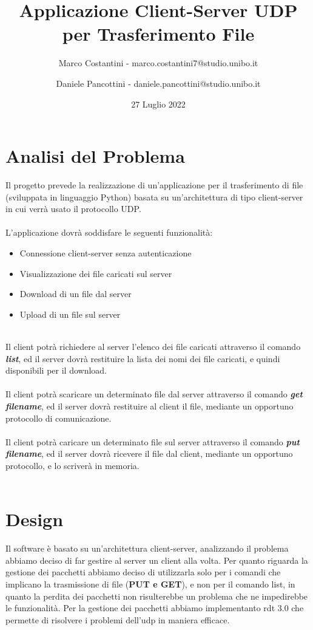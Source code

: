 \documentclass{article}
\title{Applicazione Client-Server UDP per Trasferimento File}
\author{Marco Costantini - marco.costantini7@studio.unibo.it \and Daniele Pancottini - daniele.pancottini@studio.unibo.it}
\date{27 Luglio 2022}
\begin{document}
\maketitle
\newpage

\tableofcontents

\newpage
\section{Analisi del Problema}


Il progetto prevede la realizzazione di un'applicazione per il trasferimento di file (sviluppata in linguaggio Python) basata su un'architettura di tipo client-server in cui verrà usato il protocollo UDP.\\\\
L'applicazione dovrà soddisfare le seguenti funzionalità:

	\begin{itemize}
		\item Connessione client-server senza autenticazione
		\item Visualizzazione dei file caricati sul server
		\item Download di un file dal server
		\item Upload di un file sul server
	\end{itemize}
\ \\
Il client potrà richiedere al server l'elenco dei file caricati attraverso il comando \textbf{\emph{list}}, ed il server dovrà restituire la lista dei nomi dei file caricati, e quindi disponibili per il download.\\\\
Il client potrà scaricare un determinato file dal server attraverso il comando \textbf{\emph{get filename}}, ed il server dovrà restituire al client il file, mediante un opportuno protocollo di comunicazione.\\\\
Il client potrà caricare un determinato file sul server attraverso il comando \textbf{\emph{put filename}}, ed il server dovrà ricevere il file dal client, mediante un opportuno protocollo, e lo scriverà in memoria.\\\\

\newpage
\section{Design}
Il software è basato su un'architettura client-server, analizzando il problema abbiamo deciso di far gestire al server un client alla volta.
Per quanto riguarda la gestione dei pacchetti abbiamo deciso di utilizzarla solo per i comandi che implicano la trasmissione di file (\textbf{PUT e GET}), e non per il comando list, in quanto la perdita dei pacchetti non risulterebbe un problema che ne impedirebbe le funzionalità.
Per la gestione dei pacchetti abbiamo implementanto rdt 3.0 che permette di risolvere i problemi dell'udp in maniera efficace.
\ \\
\end{document}
